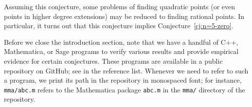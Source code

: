Assuming this conjecture, some problems of finding quadratic points
(or even points in higher degree extensions) may be reduced to finding
rational points. In particular, it turns out that this conjecture
implies Conjecture~\ref{cj:n=5-zero}.

Before we close the introduction section, note that we have a handful
of C++, Mathematica, or Sage programs to verify various results and
provide empirical evidence for certain conjectures. These programs are
available in a public repository on GitHub; see \cite{src} in the
reference list. Whenever we need to refer to such a program, we print
its path in the repository in monospaced font; for instance,
\texttt{mma/abc.m} refers to the Mathematica package \texttt{abc.m} in
the \texttt{mma/} directory of the repository.

